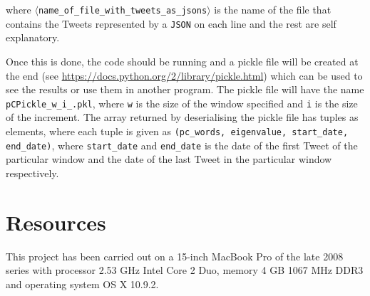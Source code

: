 \documentclass[11pt,a4paper]{article}
\begin{document}
where \texttt{$\langle$name\_of\_file\_with\_tweets\_as\_jsons$\rangle$} is the name of the file that contains the Tweets represented by a \texttt{JSON} on each line and the rest are self explanatory.

Once this is done, the code should be running and a pickle file will be created at the end (see \url{https://docs.python.org/2/library/pickle.html}) which can be used to see the results or use them in another program. The pickle file will have the name \texttt{pCPickle\_w\_i\_.pkl}, where \texttt{w} is the size of the window specified and \texttt{i} is the size of the increment. The array returned by deserialising the pickle file has tuples as elements, where each tuple is given as 
\texttt{(pc\_words, eigenvalue, start\_date, end\_date)}, where \texttt{start\_date} and \texttt{end\_date} is the date of the first Tweet of the particular window and the date of the last Tweet in the particular window respectively.
\section{Resources}
This project has been carried out on a 15-inch MacBook Pro of the late 2008 series with processor 2.53 GHz Intel Core 2 Duo, memory 4 GB 1067 MHz DDR3 and operating system OS X 10.9.2.
\end{document}
